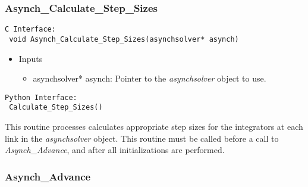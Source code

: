 \documentclass[12pt]{article}
\begin{document}
\subsubsection{Asynch\_Calculate\_Step\_Sizes} \label{sec: asynch_calculate_step_sizes}

\begin{lstlisting}[style=CStyle]
 C Interface:
 void Asynch_Calculate_Step_Sizes(asynchsolver* asynch)
\end{lstlisting}
\begin{itemize}
 \item Inputs
  \begin{itemize}
   \item asynchsolver* asynch: Pointer to the \emph{asynchsolver} object to use.
  \end{itemize}
\end{itemize}
\begin{lstlisting}[style=PythonStyle]
 Python Interface:
 Calculate_Step_Sizes()
\end{lstlisting}
This routine processes calculates appropriate step sizes for the integrators at each link in the \emph{asynchsolver} object. This routine must be called before a call to \emph{Asynch\_Advance}, and after all initializations are performed.



\subsubsection{Asynch\_Advance} \label{sec: asynch_advance}
\end{document}
